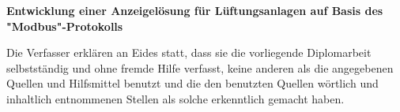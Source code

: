 
\vspace{30pt}

\begin{center}
    \textbf{\LARGE Entwicklung einer Anzeigelösung für Lüftungsanlagen auf Basis des "Modbus"-Protokolls}
\end{center}

\vspace{30pt}

\noindent Die Verfasser erklären an Eides statt, dass sie die vorliegende Diplomarbeit selbstständig und ohne fremde Hilfe verfasst, keine anderen als die angegebenen Quellen und Hilfsmittel benutzt und die den benutzten Quellen wörtlich und inhaltlich entnommenen Stellen als solche erkenntlich gemacht haben.

\vfill

